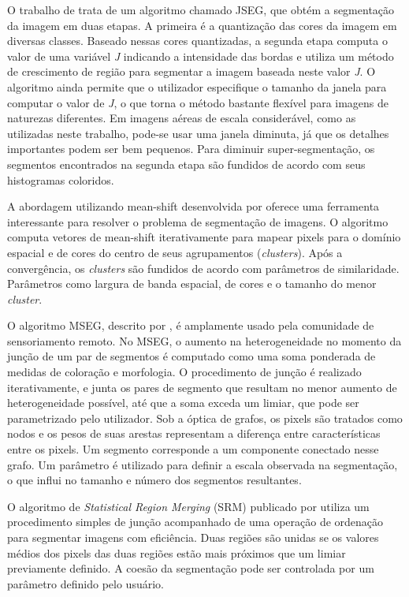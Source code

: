 O trabalho de  trata de um algoritmo chamado JSEG, que obtém a segmentação da imagem em duas etapas. A primeira é a  quantização das cores da imagem em diversas classes. Baseado nessas cores quantizadas, a segunda etapa computa o valor de uma variável \textit{J} indicando a intensidade das bordas e utiliza um método de crescimento de região para segmentar a imagem baseada neste valor \textit{J}. O algoritmo ainda permite que o utilizador especifique o tamanho da janela para computar o valor de \textit{J}, o que torna o método bastante flexível para imagens de naturezas diferentes. Em imagens aéreas de escala considerável, como as utilizadas neste trabalho, pode-se usar uma janela diminuta, já que os detalhes importantes podem ser bem pequenos. Para diminuir super-segmentação, os segmentos encontrados na segunda etapa são fundidos de acordo com seus histogramas coloridos.

A abordagem utilizando mean-shift desenvolvida por  oferece uma ferramenta interessante para resolver o problema de segmentação de imagens. O algoritmo computa vetores de mean-shift iterativamente para mapear pixels para o domínio espacial e de cores do centro de seus agrupamentos (\textit{clusters}). Após a convergência, os \textit{clusters} são fundidos de acordo com parâmetros de similaridade. Parâmetros como largura de banda espacial, de cores e o tamanho do menor \textit{cluster}.

O algoritmo MSEG, descrito por , é amplamente usado pela comunidade de sensoriamento remoto. No MSEG, o aumento na heterogeneidade no momento da junção de um par de segmentos é computado como uma soma ponderada de medidas de coloração e morfologia. O procedimento de junção é realizado iterativamente, e  junta os pares de segmento que resultam no menor aumento de heterogeneidade possível, até que a soma exceda um limiar, que pode ser parametrizado pelo utilizador. Sob a óptica de grafos, os pixels são tratados como nodos e os pesos de suas arestas representam a diferença entre características entre os pixels. Um segmento corresponde a um componente conectado nesse grafo. Um parâmetro é utilizado para definir a escala observada na segmentação, o que influi no tamanho e número dos segmentos resultantes.

O algoritmo de \textit{Statistical Region Merging} (SRM) publicado por  utiliza um procedimento simples de junção acompanhado de uma operação de ordenação para segmentar imagens com eficiência. Duas regiões são unidas se os valores médios dos pixels das duas regiões estão mais próximos que um limiar previamente definido. A coesão da segmentação pode ser controlada por um parâmetro definido pelo usuário.

